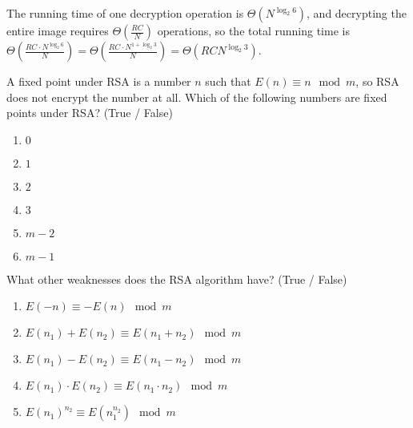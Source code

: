 \documentclass[12pt,twoside]{article}
\begin{document}
\begin{problems}
\begin {problemparts}
{  The running time of one decryption operation is $\Theta(N^{\log_2 6})$, and
  decrypting the entire image requires $\Theta(\frac{RC}{N})$ operations, so the
  total running time is $\Theta(\frac{RC \cdot N^{\log_2 6}}{N}) =
  \Theta(\frac{RC \cdot N^{1 + \log_2 3}}{N}) = \Theta(RCN^{\log_2 3})$.
}

\problempart {} A fixed point under RSA is a number $n$ such that $E(n)
\equiv n \mod m$, so RSA does not encrypt the number at all. Which of the
following numbers are fixed points under RSA? (True / False)
\begin{enumerate}
  \item $0$
  \item $1$
  \item $2$
  \item $3$
  \item $m - 2$
  \item $m - 1$
\end{enumerate}
  
\problempart {} What other weaknesses does the RSA algorithm have?
(True / False)
\begin{enumerate}
  \item $E(-n) \equiv -E(n) \mod m$
  \item $E(n_1) + E(n_2) \equiv E(n_1 + n_2) \mod m$
  \item $E(n_1) - E(n_2) \equiv E(n_1 - n_2) \mod m$
  \item $E(n_1) \cdot E(n_2) \equiv E(n_1 \cdot n_2) \mod m$
  \item $E(n_1)^{n_2} \equiv E(n_1 ^ {n_2}) \mod m$
\end{enumerate}
\end{problemparts}
\end{problems}
\end{document}
